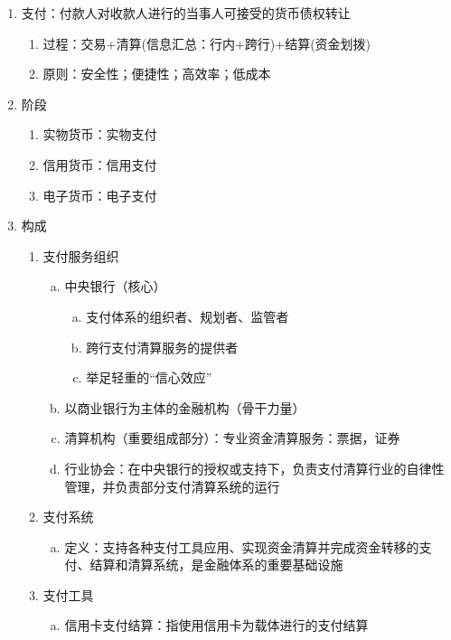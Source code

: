 \documentclass[12pt]{book}
\begin{document}
\begin{enumerate}[1.]
    \item 支付：付款人对收款人进行的当事人可接受的货币债权转让
    \begin{enumerate}[(1)]
        \item 过程：交易+清算(信息汇总：行内+跨行)+结算(资金划拨)
        \item 原则：安全性；便捷性；高效率；低成本
    \end{enumerate}
    \item 阶段
    \begin{enumerate}[(1)]
        \item 实物货币：实物支付
        \item 信用货币：信用支付
        \item 电子货币：电子支付
    \end{enumerate}
    \item 构成
    \begin{enumerate}[(1)]
        \item 支付服务组织
        \begin{enumerate}[a.]
            \item 中央银行（核心）
            \begin{enumerate}[(a)]
                \item 支付体系的组织者、规划者、监管者
                \item 跨行支付清算服务的提供者
                \item 举足轻重的“信心效应”
            \end{enumerate}
            \item 以商业银行为主体的金融机构（骨干力量）
            \item 清算机构（重要组成部分）：专业资金清算服务：票据，证券
            \item 行业协会：在中央银行的授权或支持下，负责支付清算行业的自律性管理，并负责部分支付清算系统的运行
        \end{enumerate}
        \item 支付系统
        \begin{enumerate}[a.]
            \item 定义：支持各种支付工具应用、实现资金清算并完成资金转移的支付、结算和清算系统，是金融体系的重要基础设施
        \end{enumerate}
        \item 支付工具
        \begin{enumerate}[a.]
            \item 信用卡支付结算：指使用信用卡为载体进行的支付结算

\end{enumerate}
\end{enumerate}
\end{enumerate}
\end{document}
